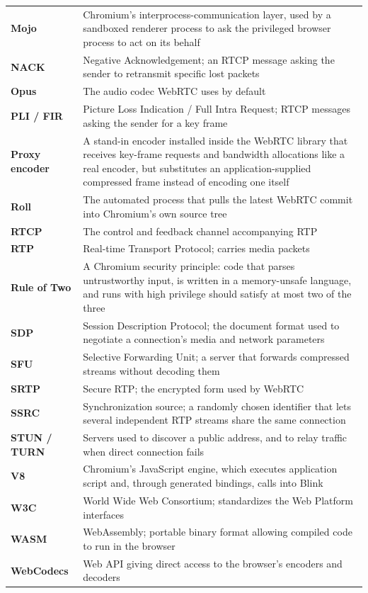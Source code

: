 \documentclass[11pt]{article}
\begin{document}
\begin{longtable}{@{}p{}p{}@{}}
\textbf{Mojo} & Chromium's interprocess-communication layer, used by a sandboxed renderer process to ask the privileged browser process to act on its behalf \\
\textbf{NACK} & Negative Acknowledgement; an RTCP message asking the sender to retransmit specific lost packets \\
\textbf{Opus} & The audio codec WebRTC uses by default \\
\textbf{PLI / FIR} & Picture Loss Indication / Full Intra Request; RTCP messages asking the sender for a key frame \\
\textbf{Proxy encoder} & A stand-in encoder installed inside the WebRTC library that receives key-frame requests and bandwidth allocations like a real encoder, but substitutes an application-supplied compressed frame instead of encoding one itself \\
\textbf{Roll} & The automated process that pulls the latest WebRTC commit into Chromium's own source tree \\
\textbf{RTCP} & The control and feedback channel accompanying RTP \\
\textbf{RTP} & Real-time Transport Protocol; carries media packets \\
\textbf{Rule of Two} & A Chromium security principle: code that parses untrustworthy input, is written in a memory-unsafe language, and runs with high privilege should satisfy at most two of the three \\
\textbf{SDP} & Session Description Protocol; the document format used to negotiate a connection's media and network parameters \\
\textbf{SFU} & Selective Forwarding Unit; a server that forwards compressed streams without decoding them \\
\textbf{SRTP} & Secure RTP; the encrypted form used by WebRTC \\
\textbf{SSRC} & Synchronization source; a randomly chosen identifier that lets several independent RTP streams share the same connection \\
\textbf{STUN / TURN} & Servers used to discover a public address, and to relay traffic when direct connection fails \\
\textbf{V8} & Chromium's JavaScript engine, which executes application script and, through generated bindings, calls into Blink \\
\textbf{W3C} & World Wide Web Consortium; standardizes the Web Platform interfaces \\
\textbf{WASM} & WebAssembly; portable binary format allowing compiled code to run in the browser \\
\textbf{WebCodecs} & Web API giving direct access to the browser's encoders and decoders \\
\bottomrule
\end{longtable}
\end{document}
